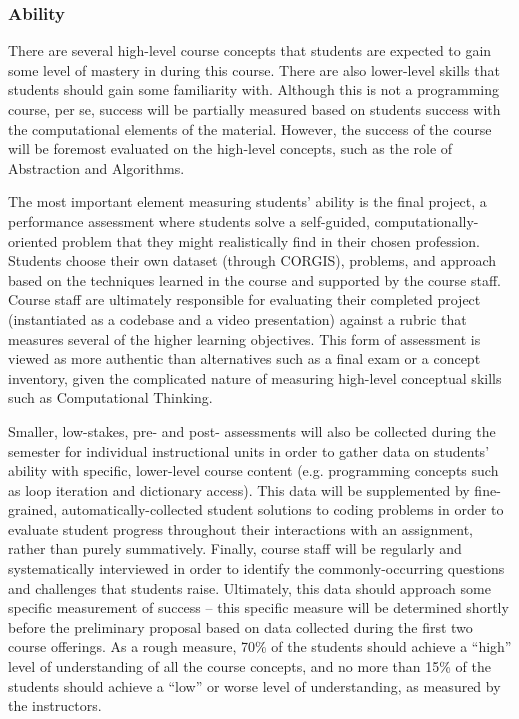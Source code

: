 \subsubsection{Ability}
There are several high-level course concepts that students are expected to gain some level of mastery in during this course.
There are also lower-level skills that students should gain some familiarity with.
Although this is not a programming course, per se, success will be partially measured based on students success with the computational elements of the material.
However, the success of the course will be foremost evaluated on the high-level concepts, such as the role of Abstraction and Algorithms.

The most important element measuring students' ability is the final project, a performance assessment where students solve a self-guided, computationally-oriented problem that they might realistically find in their chosen profession.
Students choose their own dataset (through CORGIS), problems, and approach based on the techniques learned in the course and supported by the course staff.
Course staff are ultimately responsible for evaluating their completed project (instantiated as a codebase and a video presentation) against a rubric that measures several of the higher learning objectives.
This form of assessment is viewed as more authentic than alternatives such as a final exam or a concept inventory, given the complicated nature of measuring high-level conceptual skills such as Computational Thinking.

Smaller, low-stakes, pre- and post- assessments will also be collected during the semester for individual instructional units in order to gather data on students’ ability with specific, lower-level course content (e.g. programming concepts such as loop iteration and dictionary access).
This data will be supplemented by fine-grained, automatically-collected student solutions to coding problems in order to evaluate student progress throughout their interactions with an assignment, rather than purely summatively.
Finally, course staff will be regularly and systematically interviewed in order to identify the commonly-occurring questions and challenges that students raise.
Ultimately, this data should approach some specific measurement of success -- this specific measure will be determined shortly before the preliminary proposal based on data collected during the first two course offerings.
As a rough measure, 70\% of the students should achieve a ``high'' level of understanding of all the course concepts, and no more than 15\% of the students should achieve a ``low'' or worse level of understanding, as measured by the instructors.

